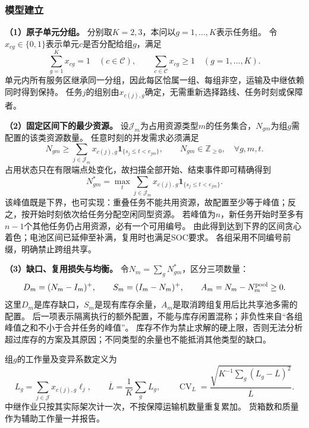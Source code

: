 \subsubsection{模型建立}
\label{sec:q4:formulation}

\textbf{（1）原子单元分组。}
分别取$K=2,3$，本问以$g=1,\ldots,K$表示任务组。
令$x_{cg}\in\{0,1\}$表示单元$c$是否分配给组$g$，满足
\begin{equation}
  \sum_{g=1}^{K}x_{cg}=1\quad(c\in\mathcal C),\qquad
  \sum_{c\in\mathcal C}x_{cg}\ge1\quad(g=1,\ldots,K).
  \label{eq:q4:partition}
\end{equation}
单元内所有服务区继承同一分组，因此每区恰属一组、每组非空，运输及中继依赖同时得到保持。
任务$j$的组别由$x_{c(j),g}$确定，无需重新选择路线、任务时刻或保障者。

\textbf{（2）固定区间下的最少资源。}
设$\mathcal J_m$为占用资源类型$m$的任务集合，$N_{gm}$为组$g$需配置的该类资源数量。
任意时刻的并发需求必须满足
\begin{equation}
  N_{gm}\ge
  \sum_{j\in\mathcal J_m}x_{c(j),g}
     \mathbf 1_{\{s_j\le t<e_{jm}\}},\qquad
  N_{gm}\in\mathbb Z_{\ge0},\quad \forall g,m,t.
  \label{eq:q4:capacity}
\end{equation}
占用状态只在有限端点处变化，故扫描全部开始、结束事件即可精确得到
\begin{equation}
  N_{gm}^{*}=\max_t
  \sum_{j\in\mathcal J_m}x_{c(j),g}
     \mathbf 1_{\{s_j\le t<e_{jm}\}}.
  \label{eq:q4:peak}
\end{equation}
该峰值既是下界，也可实现：重叠任务不能共用资源，故配置至少等于峰值；反之，按开始时刻依次给任务分配空闲同型资源。
若峰值为$n$，新任务开始时至多有$n-1$个其他任务仍占用资源，必有一个可用编号。
由此得到达到下界的区间贪心着色；电池区间已延伸至补满，复用时也满足SOC要求。
各组采用不同编号前缀，明确禁止跨组共享。

\textbf{（3）缺口、复用损失与均衡。}
令$N_m=\sum_gN_{gm}^{*}$，区分三项数量：
\begin{equation}
  D_m=(N_m-I_m)^+,\qquad
  S_m=(I_m-N_m)^+,\qquad
  A_m=N_m-N_m^{\rm pool}\ge0.
  \label{eq:q4:resource-difference}
\end{equation}
这里$D_m$是库存缺口，$S_m$是现有库存余量，$A_m$是取消跨组复用后比共享池多需的配置。
后一项表示隔离执行的额外配置，不能与库存闲置混称；非负性来自“各组峰值之和不小于合并任务的峰值”。
库存不作为禁止求解的硬上限，否则无法分析超过库存的方案及其原因；不同类型的余量也不能抵消其他类型的缺口。

组$g$的工作量及变异系数定义为
\begin{equation}
  L_g=\sum_{j\in\mathcal J}x_{c(j),g}\ell_j,\qquad
  \overline L=\frac1K\sum_gL_g,\qquad
  \operatorname{CV}_L=
  \frac{\sqrt{K^{-1}\sum_g(L_g-\overline L)^2}}{\overline L}.
  \label{eq:q4:balance}
\end{equation}
中继作业只按其实际架次计一次，不按保障运输机数量重复累加。
货箱数和质量作为辅助工作量一并报告。


